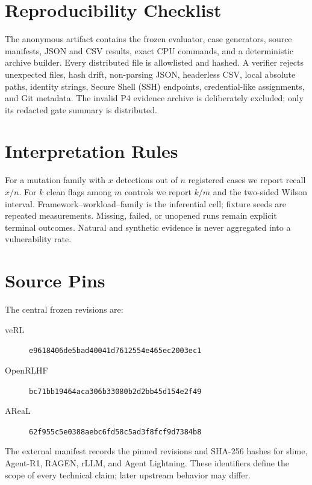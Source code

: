 \documentclass[10pt]{article}
\begin{document}



\appendix
\section{Reproducibility Checklist}

The anonymous artifact contains the frozen evaluator, case generators, source
manifests, JSON and CSV results, exact CPU commands, and a deterministic archive
builder.  Every distributed file is allowlisted and hashed.  A verifier rejects
unexpected files, hash drift, non-parsing JSON, headerless CSV, local absolute
paths, identity strings, Secure Shell (SSH) endpoints, credential-like
assignments, and Git
metadata.  The invalid P4 evidence archive is deliberately excluded; only its
redacted gate summary is distributed.

\section{Interpretation Rules}

For a mutation family with $x$ detections out of $n$ registered cases we report
recall $x/n$.  For $k$ clean flags among $m$ controls we report $k/m$ and the
two-sided Wilson interval.  Framework--workload--family is the inferential
cell; fixture seeds are repeated measurements.  Missing, failed, or unopened
runs remain explicit terminal outcomes.  Natural and synthetic evidence is
never aggregated into a vulnerability rate.

\section{Source Pins}

The central frozen revisions are:
\begin{description}
  \item[veRL] \nolinkurl{e9618406de5bad40041d7612554e465ec2003ec1}
  \item[OpenRLHF] \nolinkurl{bc71bb19464aca306b33080b2d2bb45d154e2f49}
  \item[AReaL] \nolinkurl{62f955c5e0388aebc6fd58c5ad3f8fcf9d7384b8}
\end{description}
The external manifest records the pinned revisions and SHA-256 hashes for
slime, Agent-R1, RAGEN, rLLM, and Agent Lightning.  These identifiers define
the scope of every technical claim; later upstream behavior may differ.
\end{document}
